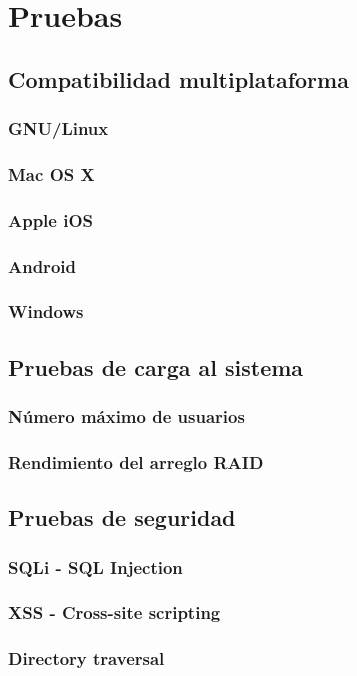 {
  \linespread{1}
  \cleardoublepage  
  \chapter{Pruebas}
  \label{chap:cap4}
}

    \section {Compatibilidad multiplataforma}
      \subsection {GNU/Linux}
      \subsection {Mac OS X}
      \subsection {Apple iOS}
      \subsection {Android}
      \subsection {Windows}
    \section {Pruebas de carga al sistema}
      \subsection {N\'{u}mero m\'{a}ximo de usuarios}
      \subsection {Rendimiento del arreglo RAID}
    \section {Pruebas de seguridad}
      \subsection {SQLi - SQL Injection}
      \subsection {XSS - Cross-site scripting}
      \subsection {Directory traversal}
